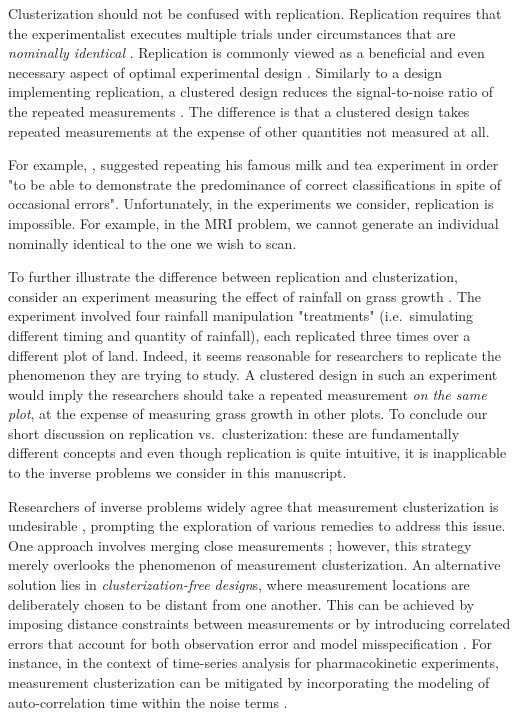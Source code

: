 Clusterization should not be confused with replication. Replication
requires that the experimentalist executes multiple trials under
circumstances that are \emph{nominally identical} \cite[Section
  1.2.4]{morris2011}. Replication is commonly viewed as a beneficial
and even necessary aspect of optimal experimental design
\cite{fisher1949design, morris2011, schafer2001replication}. Similarly
to a design implementing replication, a clustered design reduces the
signal-to-noise ratio of the repeated measurements
\cite{telford2007brief}. The difference is that a clustered design
takes repeated measurements at the expense of other quantities not
measured at all.

For example, \cite{fisher1949design}, suggested repeating his famous
milk and tea experiment in order "to be able to demonstrate the
predominance of correct classifications in spite of occasional
errors". Unfortunately, in the experiments we consider, replication is
impossible. For example, in the MRI problem, we cannot generate an
individual nominally identical to the one we wish to scan.

To further illustrate the difference between replication and
clusterization, consider an experiment measuring the effect of
rainfall on grass growth \cite{fay2000rainfall}. The experiment
involved four rainfall manipulation "treatments" (i.e.~simulating
different timing and quantity of rainfall), each replicated three
times over a different plot of land. Indeed, it seems reasonable for
researchers to replicate the phenomenon they are trying to study. A
clustered design in such an experiment would imply the researchers
should take a repeated measurement \emph{on the same plot}, at the
expense of measuring grass growth in other plots. To conclude our
short discussion on replication vs.~clusterization: these are
fundamentally different concepts and even though replication is quite
intuitive, it is inapplicable to the inverse problems we consider in
this manuscript.




Researchers of inverse problems widely agree that measurement
clusterization is undesirable \cite{fedorov1996, nyberg2012,
  fedorov1997, Ucinski05, neitzel2019sparse}, prompting the
exploration of various remedies to address this issue. One approach
involves merging close measurements \cite{fedorov1997}; however, this
strategy merely overlooks the phenomenon of measurement
clusterization. An alternative solution lies in
\emph{clusterization-free design}s, where measurement locations are
deliberately chosen to be distant from one another. This can be
achieved by imposing distance constraints between measurements or by
introducing correlated errors that account for both observation error
and model misspecification \cite{Ucinski05}. For instance, in the
context of time-series analysis for pharmacokinetic experiments,
measurement clusterization can be mitigated by incorporating the
modeling of auto-correlation time within the noise terms
\cite{nyberg2012}.


